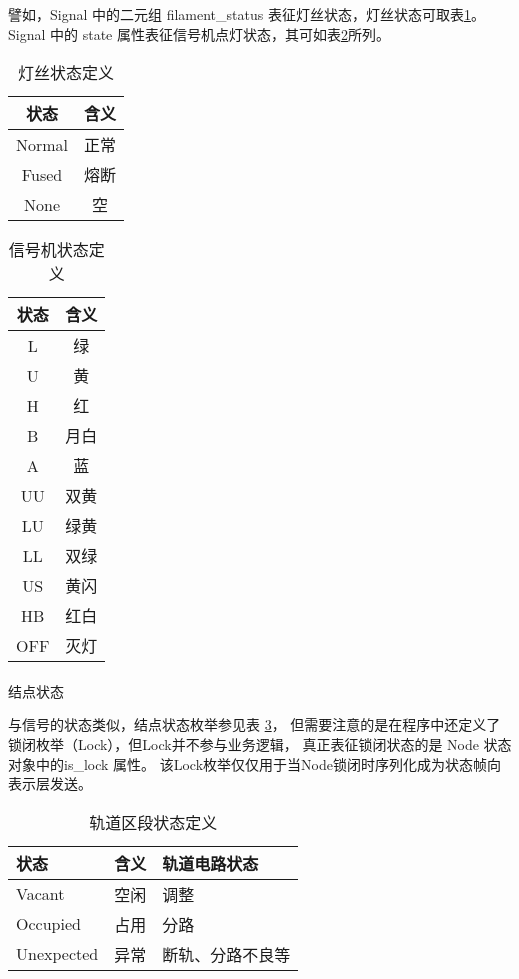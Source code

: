 譬如，Signal 中的二元组 filament\_status 表征灯丝状态，灯丝状态可取表\ref{fila_state}。
Signal 中的 state 属性表征信号机点灯状态，其可如表\ref{sgn_state}所列。
\begin{table}[htpb!]
    \centering
    \caption{\label{fila_state}灯丝状态定义}
    \begin{tabular}{cc}
        \toprule
        状态   & 含义 \\
        \midrule
        Normal & 正常 \\
        Fused  & 熔断 \\
        None   & 空   \\
        \bottomrule
    \end{tabular}
\end{table}
\begin{table}[htpb!]
    \centering
    \caption{\label{sgn_state}信号机状态定义}
    \begin{tabular}{cc}
        \toprule
        状态 & 含义 \\
        \midrule
        L    & 绿   \\
        U    & 黄   \\
        H    & 红   \\
        B    & 月白 \\
        A    & 蓝   \\
        UU   & 双黄 \\
        LU   & 绿黄 \\
        LL   & 双绿 \\
        US   & 黄闪 \\
        HB   & 红白 \\
        OFF  & 灭灯 \\
        \bottomrule
    \end{tabular}
\end{table}

\paragraph{}结点状态

与信号的状态类似，结点状态枚举参见表 \ref{node_state}，
但需要注意的是在程序中还定义了锁闭枚举（Lock），但Lock并不参与业务逻辑，
真正表征锁闭状态的是 Node 状态对象中的is\_lock 属性。
该Lock枚举仅仅用于当Node锁闭时序列化成为状态帧向表示层发送。
\begin{table}[htpb!]
    \centering
    \caption{\label{node_state}轨道区段状态定义}
    \begin{tabular}{lcl}
        \toprule
        状态       & 含义 & 轨道电路状态     \\
        \midrule
        Vacant     & 空闲 & 调整             \\
        Occupied   & 占用 & 分路             \\
        Unexpected & 异常 & 断轨、分路不良等 \\
        \bottomrule
    \end{tabular}
\end{table}


